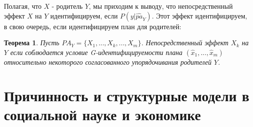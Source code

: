 \documentclass[fleqn]{article}
\newtheorem{theorem}{Теорема}
\numberwithin{equation}{section}
\numberwithin{theorem}{section}
\numberwithin{figure}{section}
\numberwithin{lemma}{section}
\numberwithin{corollary}{section}
\begin{document}
Полагая, что $X$ - родитель $Y$, мы приходим к выводу, что непосредственный эффект $X$ на $Y$ идентифицируем, если $P(y|\hat{pa}_Y)$. Этот эффект идентифицируем,  в свою очередь, если идентифицируем план для родителей:

\begin{theorem}
	Пусть $PA_Y = \{X_1,...,X_k,...,X_m\}$. Непосредственный эффект $X_k$ на $Y$ если соблюдается условие G-идентифицируемости плана $(\hat x_1,...,\hat x_m)$ относительно некоторого согласованного упорядочивания родителей $Y$. 
\end{theorem}

\section{Причинность и структурные модели в социальной науке и экономике}

  
\end{document}
